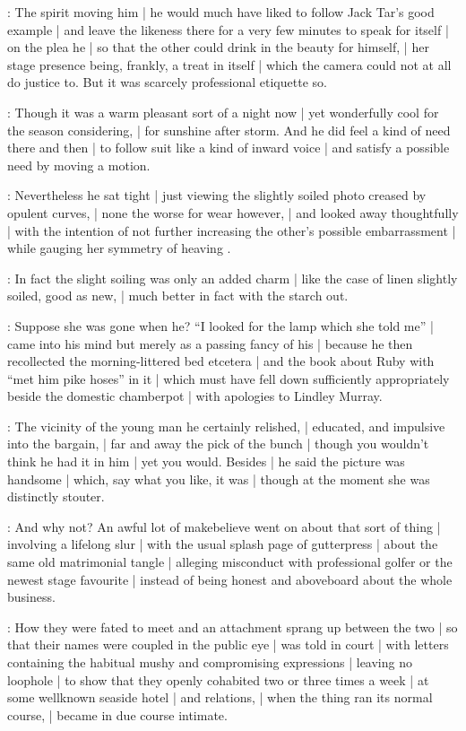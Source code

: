 :
The spirit moving him |
he would much have liked to follow Jack Tar's good example |
and leave the likeness there for a very few minutes to speak for itself |
on the plea he |
so that the other could drink in the beauty for himself, |
her stage presence being, frankly, a treat in itself |
which the camera could not at all do justice to.
But it was scarcely professional etiquette so.

:
Though it was a warm pleasant sort of a night now |
yet wonderfully cool for the season considering, |
for sunshine after storm.
And he did feel a kind of need there and then |
to follow suit like a kind of inward voice |
and satisfy a possible need by moving a motion.

:
Nevertheless he sat tight |
just viewing the slightly soiled photo creased by opulent curves, |
none the worse for wear however, |
and looked away thoughtfully |
with the intention of not further increasing the other's possible embarrassment |
while gauging her symmetry of heaving .

:
In fact the slight soiling was only an added charm |
like the case of linen slightly soiled, good as new, |
much better in fact with the starch out.

:
Suppose she was gone when he?
``I looked for the lamp which she told me'' |
came into his mind but merely as a passing fancy of his |
because he then recollected the morning-littered bed etcetera |
and the book about Ruby with ``met him pike hoses''
in it |
which must have fell down sufficiently appropriately beside the domestic chamberpot |
with apologies to Lindley Murray.

:
The vicinity of the young man
he certainly relished, |
educated,  and impulsive into the bargain, |
far and away the pick of the bunch |
though you wouldn't think he had it in him |
yet you would.
Besides |
he said the picture was handsome |
which, say what you like, it was |
though at the moment she was distinctly stouter.

:
And why not?
An awful lot of makebelieve went on about that sort of thing |
involving a lifelong slur |
with the usual splash page of gutterpress |
about the same old matrimonial tangle |
alleging misconduct with professional golfer or the newest stage favourite |
instead of being honest and aboveboard about the whole business.

:
How they were fated to meet and an attachment sprang up between the two |
so that their names were coupled in the public eye |
was told in court |
with letters containing the habitual mushy and compromising expressions |
leaving no loophole |
to show that they openly cohabited two or three times a week |
at some wellknown seaside hotel |
and relations, |
when the thing ran its normal course, |
became in due course intimate.

